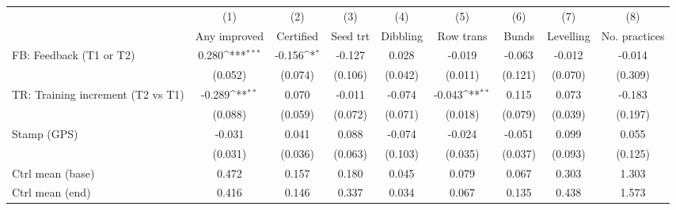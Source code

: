 {
\def\sym#1{\ifmmode^{#1}\else\(^{#1}\)\fi}
\begin{tabular}{l*{8}{c}}
\toprule
                    &\multicolumn{1}{c}{(1)}&\multicolumn{1}{c}{(2)}&\multicolumn{1}{c}{(3)}&\multicolumn{1}{c}{(4)}&\multicolumn{1}{c}{(5)}&\multicolumn{1}{c}{(6)}&\multicolumn{1}{c}{(7)}&\multicolumn{1}{c}{(8)}\\
                    &\multicolumn{1}{c}{Any improved}&\multicolumn{1}{c}{Certified}&\multicolumn{1}{c}{Seed trt}&\multicolumn{1}{c}{Dibbling}&\multicolumn{1}{c}{Row trans}&\multicolumn{1}{c}{Bunds}&\multicolumn{1}{c}{Levelling}&\multicolumn{1}{c}{No. practices}\\
\midrule
FB: Feedback (T1 or T2)&       0.280\sym{***}&      -0.156\sym{*}  &      -0.127         &       0.028         &      -0.019         &      -0.063         &      -0.012         &      -0.014         \\
                    &     (0.052)         &     (0.074)         &     (0.106)         &     (0.042)         &     (0.011)         &     (0.121)         &     (0.070)         &     (0.309)         \\
TR: Training increment (T2 vs T1)&      -0.289\sym{**} &       0.070         &      -0.011         &      -0.074         &      -0.043\sym{**} &       0.115         &       0.073         &      -0.183         \\
                    &     (0.088)         &     (0.059)         &     (0.072)         &     (0.071)         &     (0.018)         &     (0.079)         &     (0.039)         &     (0.197)         \\
Stamp (GPS)         &      -0.031         &       0.041         &       0.088         &      -0.074         &      -0.024         &      -0.051         &       0.099         &       0.055         \\
                    &     (0.031)         &     (0.036)         &     (0.063)         &     (0.103)         &     (0.035)         &     (0.037)         &     (0.093)         &     (0.125)         \\
\midrule
Ctrl mean (base)    &       0.472         &       0.157         &       0.180         &       0.045         &       0.079         &       0.067         &       0.303         &       1.303         \\
Ctrl mean (end)     &       0.416         &       0.146         &       0.337         &       0.034         &       0.067         &       0.135         &       0.438         &       1.573         \\

\end{tabular}}
